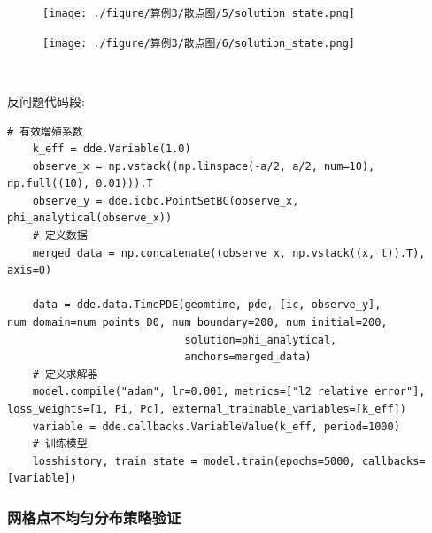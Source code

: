 \documentclass{Sichuan Normal University}
\begin{document}
\begin{figure}[H]
    \centering
    \begin{minipage}[c]{0.48\textwidth}
    \centering
    \texttt{[image: ./figure/算例3/散点图/5/solution\_state.png]}
    \end{minipage}
    \hspace{0.02\textwidth}
    \begin{minipage}[c]{0.48\textwidth}
    \centering
    \texttt{[image: ./figure/算例3/散点图/6/solution\_state.png]}
    \end{minipage}\\[3mm]
    \begin{minipage}[t]{0.48\textwidth}
    \centering
    \label{fig:算例5散点图}
    \end{minipage}
    \hspace{0.02\textwidth}
    \begin{minipage}[t]{0.48\textwidth}
    \centering
    \label{fig:算例6散点图}
    \end{minipage}
    \end{figure}
反问题代码段:
\begin{lstlisting}[style=python,basicstyle=\footnotesize\fontspec{Courier New},]  
    # 有效增殖系数
    k_eff = dde.Variable(1.0)
    observe_x = np.vstack((np.linspace(-a/2, a/2, num=10), np.full((10), 0.01))).T
    observe_y = dde.icbc.PointSetBC(observe_x, phi_analytical(observe_x))
    # 定义数据
    merged_data = np.concatenate((observe_x, np.vstack((x, t)).T), axis=0)

    data = dde.data.TimePDE(geomtime, pde, [ic, observe_y], num_domain=num_points_D0, num_boundary=200, num_initial=200,
                            solution=phi_analytical,
                            anchors=merged_data)
    # 定义求解器
    model.compile("adam", lr=0.001, metrics=["l2 relative error"], loss_weights=[1, Pi, Pc], external_trainable_variables=[k_eff])
    variable = dde.callbacks.VariableValue(k_eff, period=1000)
    # 训练模型
    losshistory, train_state = model.train(epochs=5000, callbacks=[variable])
\end{lstlisting}
    
\subsubsection{网格点不均匀分布策略验证}\label{sec:网格点不均匀分布策略验证}
\end{document}
